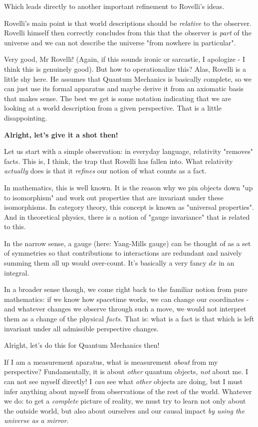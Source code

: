 \documentclass{article}
\begin{document}
Which leads directly to another important refinement to Rovelli's ideas.

Rovelli's main point is that world descriptions should be \textit{relative} to the observer. Rovelli himself then correctly concludes from this that the observer is \textit{part} of the universe and we can not describe the universe "from nowhere in particular".

Very good, Mr Rovelli! (Again, if this sounds ironic or sarcastic, I apologize - I think this is genuinely good). But how to operationalize this? Alas, Rovelli is a little shy here. He assumes that Quantum Mechanics is basically complete, so we can just use its formal apparatus and maybe derive it from an axiomatic basis that makes sense. The best we get is some notation indicating that we are looking at a world description from a given perspective. That is a little disappointing.

\textbf{Alright, let's give it a shot then!}

Let us start with a simple observation: in everyday language, relativity "removes" facts. This is, I think, the trap that Rovelli has fallen into. What relativity \textit{actually} does is that it \textit{refines} our notion of what counts as a fact.

In mathematics, this is well known. It is the reason why we pin objects down "up to isomorphism" and work out properties that are invariant under these isomorphisms. In category theory, this concept is known as "universal properties". And in theoretical physics, there is a notion of "gauge invariance" that is related to this.

In the narrow sense, a gauge (here: Yang-Mills gauge) can be thought of as a set of symmetries so that contributions to interactions are redundant and naively summing them all up would over-count. It's basically a very fancy $dx$ in an integral.

In a broader sense though, we come right back to the familiar notion from pure mathematics: if we know how spacetime works, we can change our coordinates - and whatever changes we observe through such a move, we would not interpret them as a change of the physical \textit{facts}. That is: what is a fact is that which is left invariant under all admissible perspective changes.

Alright, let's do this for Quantum Mechanics then!

If I am a measurement aparatus, what is measurement \textit{about} from my perspective? Fundamentally, it is about \textit{other} quantum objects, \textit{not} about me. I can not see myself directly! I \textit{can} see what \textit{other} objects are doing, but I must infer anything about myself from observations of the rest of the world. Whatever we do: to get a \textit{complete} picture of reality, we must try to learn not only about the outside world, but also about ourselves and our causal impact \textit{by using the universe as a mirror}.
\end{document}

